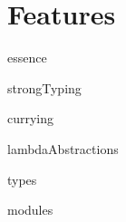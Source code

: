\section{Features}

{essence}

{strongTyping}

{currying}

{lambdaAbstractions}

{types}

{modules}
